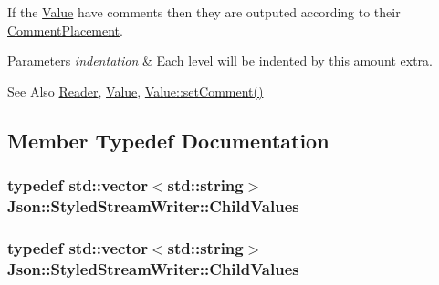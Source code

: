 If the \hyperlink{classJson_1_1Value}{Value} have comments then they are outputed according to their \hyperlink{namespaceJson_a4fc417c23905b2ae9e2c47d197a45351}{Comment\-Placement}.


\begin{DoxyParams}{Parameters}
{\em indentation} & Each level will be indented by this amount extra. \\
\hline
\end{DoxyParams}
\begin{DoxySeeAlso}{See Also}
\hyperlink{classJson_1_1Reader}{Reader}, \hyperlink{classJson_1_1Value}{Value}, \hyperlink{classJson_1_1Value_a29f3a30f7e5d3af6f38d57999bf5b480}{Value\-::set\-Comment()} 
\end{DoxySeeAlso}


\subsection{Member Typedef Documentation}
\hypertarget{classJson_1_1StyledStreamWriter_ad0e42dda934aaee87fa9434c30186a9b}{
\subsubsection[{Child\-Values}]{\setlength{\rightskip}{0pt plus 5cm}typedef std\-::vector$<$std\-::string$>$ {\bf Json\-::\-Styled\-Stream\-Writer\-::\-Child\-Values}\hspace{0.3cm}{\ttfamily [private]}}}\label{d8/dc0/classJson_1_1StyledStreamWriter_ad0e42dda934aaee87fa9434c30186a9b}
\hypertarget{classJson_1_1StyledStreamWriter_ad0e42dda934aaee87fa9434c30186a9b}{
\subsubsection[{Child\-Values}]{\setlength{\rightskip}{0pt plus 5cm}typedef std\-::vector$<$std\-::string$>$ {\bf Json\-::\-Styled\-Stream\-Writer\-::\-Child\-Values}\hspace{0.3cm}{\ttfamily [private]}}}\label{d8/dc0/classJson_1_1StyledStreamWriter_ad0e42dda934aaee87fa9434c30186a9b}


